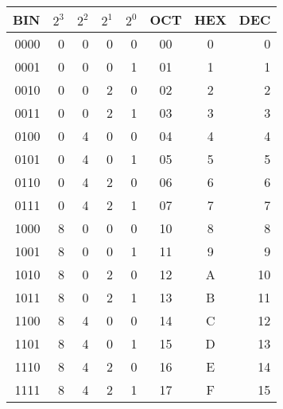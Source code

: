 \begin{tabular}{r|rrrr|c|c|r}
  BIN & \(2^3\) & \(2^2\) & \(2^1\) & \(2^0\) & OCT & HEX & DEC\\ \hline
  0000 & 0 & 0 & 0 & 0 & 00 & 0 & 0 \\
  0001 & 0 & 0 & 0 & 1 & 01 & 1 & 1 \\
  0010 & 0 & 0 & 2 & 0 & 02 & 2 & 2 \\
  0011 & 0 & 0 & 2 & 1 & 03 & 3 & 3 \\
  0100 & 0 & 4 & 0 & 0 & 04 & 4 & 4 \\
  0101 & 0 & 4 & 0 & 1 & 05 & 5 & 5 \\
  0110 & 0 & 4 & 2 & 0 & 06 & 6 & 6 \\
  0111 & 0 & 4 & 2 & 1 & 07 & 7 & 7 \\
  1000 & 8 & 0 & 0 & 0 & 10 & 8 & 8 \\
  1001 & 8 & 0 & 0 & 1 & 11 & 9 & 9 \\
  1010 & 8 & 0 & 2 & 0 & 12 & A & 10 \\
  1011 & 8 & 0 & 2 & 1 & 13 & B & 11 \\
  1100 & 8 & 4 & 0 & 0 & 14 & C & 12 \\
  1101 & 8 & 4 & 0 & 1 & 15 & D & 13 \\
  1110 & 8 & 4 & 2 & 0 & 16 & E & 14 \\
  1111 & 8 & 4 & 2 & 1 & 17 & F & 15 \\
\end{tabular}
